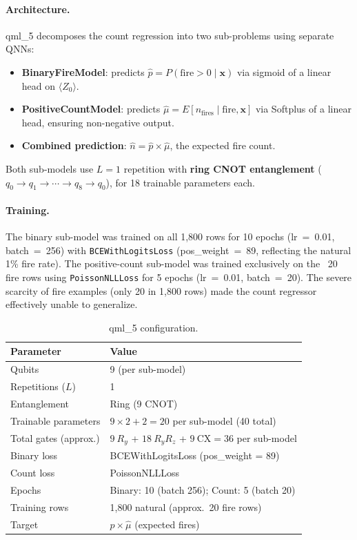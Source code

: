 \documentclass[11pt,a4paper]{article}
\begin{document}
\paragraph{Architecture.}
qml\_5 decomposes the count regression into two sub-problems using separate QNNs:
\begin{itemize}[leftmargin=*]
    \item \textbf{BinaryFireModel}: predicts $\hat{p} = P(\text{fire} > 0 \mid \mathbf{x})$ via sigmoid of a linear head on $\langle Z_0 \rangle$.
    \item \textbf{PositiveCountModel}: predicts $\hat{\mu} = E[n_{\text{fires}} \mid \text{fire}, \mathbf{x}]$ via Softplus of a linear head, ensuring non-negative output.
    \item \textbf{Combined prediction}: $\hat{n} = \hat{p} \times \hat{\mu}$, the expected fire count.
\end{itemize}
Both sub-models use $L = 1$ repetition with \textbf{ring CNOT entanglement}
($q_0{\to}q_1{\to}\cdots{\to}q_8{\to}q_0$), for 18 trainable parameters each.

\paragraph{Training.}
The binary sub-model was trained on all 1,800 rows for 10 epochs (lr~=~0.01,
batch~=~256) with \texttt{BCEWithLogitsLoss} (pos\_weight~=~89, reflecting the
natural 1\% fire rate). The positive-count sub-model was trained exclusively on
the ~20 fire rows using \texttt{PoissonNLLLoss} for 5 epochs (lr~=~0.01,
batch~=~20). The severe scarcity of fire examples (only 20 in 1,800 rows) made
the count regressor effectively unable to generalize.

\begin{table}[H]
\centering
\caption{qml\_5 configuration.}
\begin{tabular}{ll}
\toprule
\textbf{Parameter} & \textbf{Value} \\
\midrule
Qubits & 9 (per sub-model) \\
Repetitions ($L$) & 1 \\
Entanglement & Ring (9 CNOT) \\
Trainable parameters & $9 \times 2 + 2 = 20$ per sub-model (40 total) \\
Total gates (approx.) & $9\ R_y$ + $18\ R_yR_z$ + $9\ \text{CX} = 36$ per sub-model \\
Binary loss & BCEWithLogitsLoss (pos\_weight = 89) \\
Count loss & PoissonNLLLoss \\
Epochs & Binary: 10 (batch 256); Count: 5 (batch 20) \\
Training rows & 1,800 natural (approx.\ 20 fire rows) \\
Target & $\hat{p} \times \hat{\mu}$ (expected fires) \\
\bottomrule
\end{tabular}
\label{tab:qml5_config}
\end{table}
\end{document}
